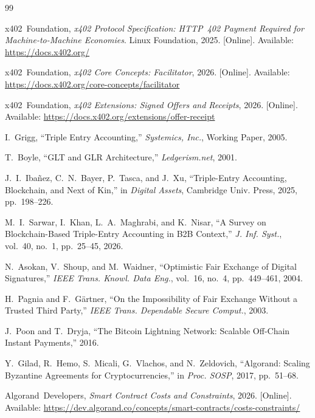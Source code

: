 \documentclass[journal]{IEEEtran}
\begin{document}

\begin{thebibliography}{99}

x402~Foundation, \emph{x402 Protocol Specification: HTTP~402 Payment Required for Machine-to-Machine Economies}. Linux Foundation, 2025. [Online]. Available: \url{https://docs.x402.org/}

x402~Foundation, \emph{x402 Core Concepts: Facilitator}, 2026. [Online]. Available: \url{https://docs.x402.org/core-concepts/facilitator}

x402~Foundation, \emph{x402 Extensions: Signed Offers and Receipts}, 2026. [Online]. Available: \url{https://docs.x402.org/extensions/offer-receipt}

I.~Grigg, ``Triple Entry Accounting,'' \emph{Systemics, Inc.}, Working Paper, 2005.

T.~Boyle, ``GLT and GLR Architecture,'' \emph{Ledgerism.net}, 2001.

J.~I.~Iba\~{n}ez, C.~N.~Bayer, P.~Tasca, and J.~Xu, ``Triple-Entry Accounting, Blockchain, and Next of Kin,'' in \emph{Digital Assets}, Cambridge Univ. Press, 2025, pp.~198--226.

M.~I.~Sarwar, I.~Khan, L.~A.~Maghrabi, and K.~Nisar, ``A Survey on Blockchain-Based Triple-Entry Accounting in B2B Context,'' \emph{J. Inf. Syst.}, vol.~40, no.~1, pp.~25--45, 2026.

N.~Asokan, V.~Shoup, and M.~Waidner, ``Optimistic Fair Exchange of Digital Signatures,'' \emph{IEEE Trans. Knowl. Data Eng.}, vol.~16, no.~4, pp.~449--461, 2004.

H.~Pagnia and F.~G\"{a}rtner, ``On the Impossibility of Fair Exchange Without a Trusted Third Party,'' \emph{IEEE Trans. Dependable Secure Comput.}, 2003.

J.~Poon and T.~Dryja, ``The Bitcoin Lightning Network: Scalable Off-Chain Instant Payments,'' 2016.

Y.~Gilad, R.~Hemo, S.~Micali, G.~Vlachos, and N.~Zeldovich, ``Algorand: Scaling Byzantine Agreements for Cryptocurrencies,'' in \emph{Proc. SOSP}, 2017, pp.~51--68.

Algorand~Developers, \emph{Smart Contract Costs and Constraints}, 2026. [Online]. Available: \url{https://dev.algorand.co/concepts/smart-contracts/costs-constraints/}


\end{thebibliography}
\end{document}
